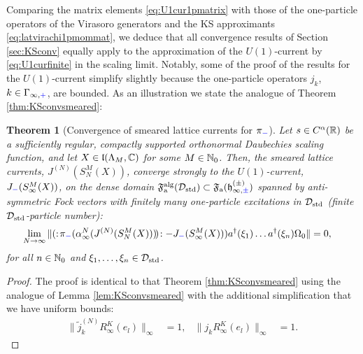 \documentclass[a4paper, 11pt]{article}
\newcommand{\ua}{\textup a}
\newcommand{\fF}{\mathfrak{F}}\newcommand{\cF}{\mathcal{F}}\newcommand{\dF}{\mathds{F}}\newcommand{\sF}{\mathscr{F}}
\newcommand{\fh}{\mathfrak{h}}
\newcommand{\fl}{\mathfrak{l}}\newcommand{\cl}{\mathcal{l}}
\DeclareMathOperator{\1}{\mathds{1}}
\DeclareMathOperator{\std}{std}
\DeclareMathOperator{\alg}{alg}
\newtheorem{thm}{Theorem} [section]
\begin{document}
Comparing the matrix elements \eqref{eq:U1cur1pmatrix} with those of the one-particle operators of the Virasoro generators and the KS approximants \eqref{eq:latvirachi1pmommat}, we deduce that all convergence results of Section \ref{sec:KSconv} equally apply to the approximation of the $U(1)$-current by \eqref{eq:U1curfinite} in the scaling limit. Notably, some of the proof of the results for the $U(1)$-current simplify slightly because the one-particle operators $j_{k}$, $k\in\Gamma_{\infty,{\color{blue}+}}$, are bounded. As an illustration we state the analogue of Theorem \ref{thm:KSconvsmeared}:
\begin{thm}[Convergence of smeared lattice currents for $\pi_{{\color{blue}-}}$]
\label{thm:U1cursmearedconv}
Let $s\in C^{\alpha}(\mathbb{R})$ be a sufficiently regular, compactly supported orthonormal Daubechies scaling function, and let $X\in\fl(\Lambda_{M},\C)$ for some $M\in\mathbb{N}_{0}$. Then, the smeared lattice currents, $J^{(N)}(S^{M}_{N}(X))$, converge strongly to the $U(1)$-current, $J_{{\color{blue}-}}(S^{M}_{\infty}(X))$, on the dense domain $\fF^{\alg}_{\ua}(\cD_{\std})\subset\fF_{\ua}(\fh^{(\pm)}_{\infty,{\color{blue}\pm}})$ spanned by anti-symmetric Fock vectors with finitely many one-particle excitations in $\cD_{\std}$ (finite $\cD_{\std}$-particle number):
\begin{align}
\label{eq:U1curconvsmeared}
\lim_{N\rightarrow\infty}\|(:\!\pi_{{\color{blue}-}}(\alpha^{N}_{\infty}(J^{(N)}(S^{M}_{N}(X)))\!)\!: - J_{{\color{blue}-}}(S^{M}_{\infty}(X)))a^{\dagger}(\xi_{1})\dots a^{\dagger}(\xi_{n})\Omega_{0}\| & = 0,
\end{align}
for all $n\in\mathbb{N}_{0}$ and $\xi_{1},\dots,\xi_{n}\in\cD_{\std}$.
\end{thm}
\begin{proof}
The proof is identical to that Theorem \ref{thm:KSconvsmeared} using the analogue of Lemma \ref{lem:KSconvsmeared} with the additional simplification that we have uniform bounds:
\begin{align*}
\|\tilde{j}^{(N)}_{k}R^{K}_{\infty}(e_{l})\|_{\infty} & = 1, & \|j_{k}R^{K}_{\infty}(e_{l})\|_{\infty} & = 1.
\end{align*}
\end{proof}
\end{document}
